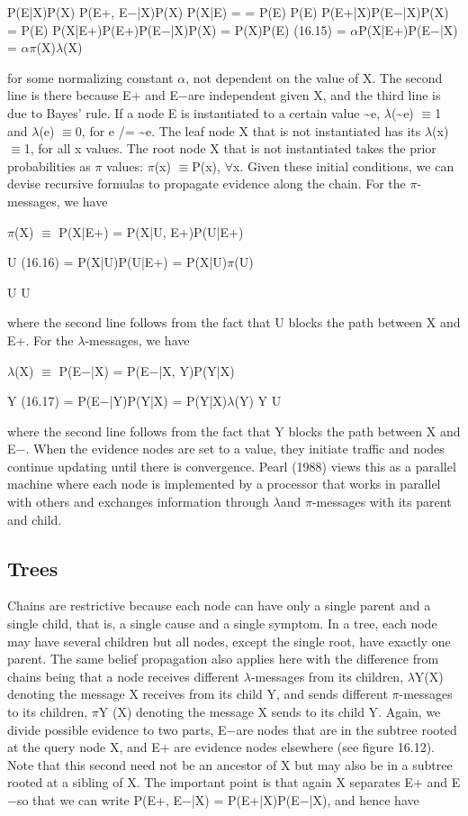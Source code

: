 P(E|X)P(X) P(E+, E$-$|X)P(X) P(X|E) = = P(E) P(E) P(E+|X)P(E$-$|X)P(X) = P(E) P(X|E+)P(E+)P(E$-$|X)P(X) = P(X)P(E) (16.15) = $\alpha$P(X|E+)P(E$-$|X) = $\alpha$$\pi$(X)$\lambda$(X)

for some normalizing constant $\alpha$, not dependent on the value of X. The second line is there because E+ and E$-$are independent given X, and the third line is due to Bayes’ rule. If a node E is instantiated to a certain value \textasciitilde{}e, $\lambda$(\textasciitilde{}e) $\equiv$1 and $\lambda$(e) $\equiv$0, for e /= \textasciitilde{}e. The leaf node X that is not instantiated has its $\lambda$(x) $\equiv$1, for all x values. The root node X that is not instantiated takes the prior probabilities as $\pi$ values: $\pi$(x) $\equiv$P(x), $\forall$x. Given these initial conditions, we can devise recursive formulas to propagate evidence along the chain. For the $\pi$-messages, we have

$\pi$(X) $\equiv$ P(X|E+) = P(X|U, E+)P(U|E+)

U (16.16) = P(X|U)P(U|E+) = P(X|U)$\pi$(U)

U U

where the second line follows from the fact that U blocks the path between X and E+. For the $\lambda$-messages, we have

$\lambda$(X) $\equiv$ P(E$-$|X) = P(E$-$|X, Y)P(Y|X)

Y (16.17) = P(E$-$|Y)P(Y|X) = P(Y|X)$\lambda$(Y) Y U

where the second line follows from the fact that Y blocks the path between X and E$-$. When the evidence nodes are set to a value, they initiate traffic and nodes continue updating until there is convergence. Pearl (1988) views this as a parallel machine where each node is implemented by a processor that works in parallel with others and exchanges information through $\lambda$and $\pi$-messages with its parent and child.

\subsection{Trees}

Chains are restrictive because each node can have only a single parent and a single child, that is, a single cause and a single symptom. In a tree, each node may have several children but all nodes, except the single root, have exactly one parent. The same belief propagation also applies here with the difference from chains being that a node receives different $\lambda$-messages from its children, $\lambda$Y(X) denoting the message X receives from its child Y, and sends different $\pi$-messages to its children, $\pi$Y (X) denoting the message X sends to its child Y. Again, we divide possible evidence to two parts, E$-$are nodes that are in the subtree rooted at the query node X, and E+ are evidence nodes elsewhere (see figure 16.12). Note that this second need not be an ancestor of X but may also be in a subtree rooted at a sibling of X. The important point is that again X separates E+ and E$-$so that we can write P(E+, E$-$|X) = P(E+|X)P(E$-$|X), and hence have

